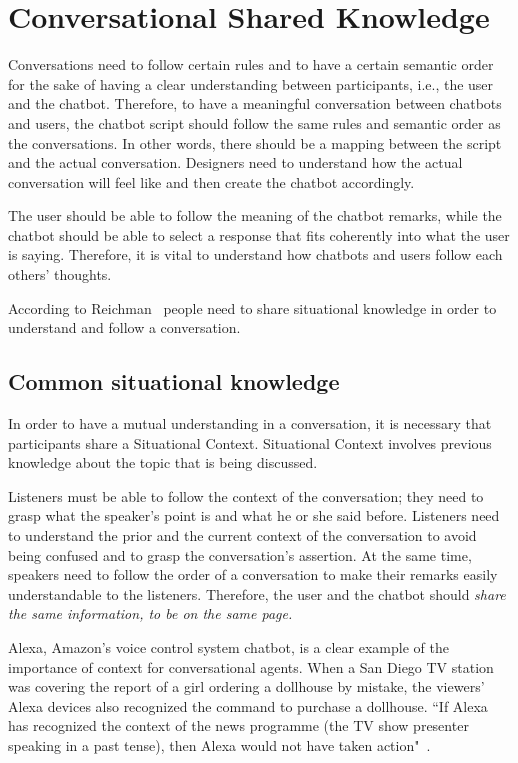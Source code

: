 \documentclass[a4paper,10pt]{article}
\begin{document}
\section{Conversational Shared Knowledge}

Conversations need to follow certain rules and to have a certain semantic order for the sake of having a clear understanding between participants, i.e., the user and the chatbot. Therefore, to have a meaningful conversation between chatbots and users, the chatbot script should follow the same rules and semantic order as the conversations. In other words, there should be a mapping between the script and the actual conversation. Designers need to understand how the actual conversation will feel like and then create the chatbot accordingly. 

The user should be able to follow the meaning of the chatbot remarks, while the chatbot should be able to select a response that fits coherently into what the user is saying. Therefore, it is vital to understand how chatbots and users follow each others' thoughts.

According to Reichman~\cite{reichman1985getting} people need to share situational knowledge in order to understand and follow a conversation.

\subsection{Common situational knowledge}
In order to have a mutual understanding in a conversation, it is necessary that participants share a Situational Context. Situational Context involves previous knowledge about the topic that is being discussed.  

Listeners must be able to follow the context of the conversation; they need to grasp what the speaker's point is and what he or she said before. Listeners need to understand the prior and the current context of the conversation to avoid being confused and to grasp the conversation's assertion. At the same time, speakers need to follow the order of a conversation to make their remarks easily understandable to the listeners. Therefore, the user and the chatbot should \textit{share the same information, to be on the same page.} 

Alexa, Amazon's voice control system chatbot, is a clear example of the importance of context for conversational agents. When  a San Diego TV station was covering the report of a girl ordering a dollhouse by mistake, the viewers' Alexa devices also recognized the command to purchase a dollhouse. ``If Alexa has recognized the context of the news programme (the TV show presenter speaking in a past tense), then Alexa would not have taken action"~\cite{WhatwecanlearnfromAlexasmistakes}.
\end{document}
